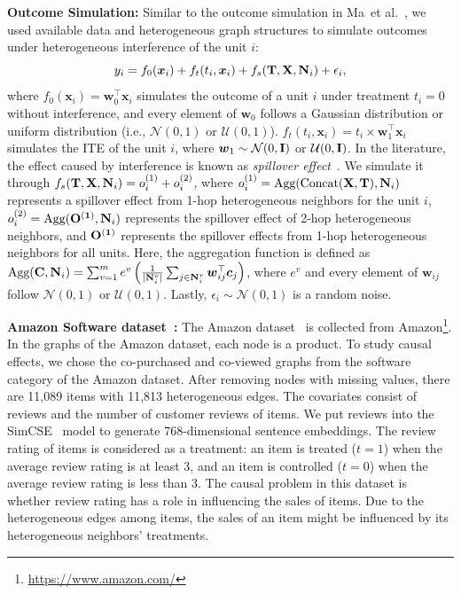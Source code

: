 \documentclass[runningheads]{llncs}
\newcommand{\etal}{{et al.}}
\begin{document}
\noindent\textbf{Outcome Simulation:}
Similar to the outcome simulation in Ma~\etal~\cite{ma2022learning}, we used available data and heterogeneous graph structures to simulate outcomes under heterogeneous interference of the unit $i$:
\begin{equation} \label{sim:outcome1}
y_i = f_{0}(\boldsymbol{x}_i) + f_{t}(t_i,\boldsymbol{x}_i) + f_s(\bold{T},\bold{X},\bold{N}_i) + \epsilon_i,
\end{equation}
where $f_{0}(\boldsymbol{x}_i)=\boldsymbol{w}_0^{\top}\boldsymbol{x}_i$ simulates the outcome of a unit $i$ under treatment $t_i=0$ without interference, and every element of $\boldsymbol{w}_0$ follows a Gaussian distribution or uniform distribution (i.e., $\mathcal{N}(0,1)$ or $\mathcal{U}(0,1)$). $f_{t}(t_i,\boldsymbol{x}_i)=t_i\times\boldsymbol{w}_1^{\top}\boldsymbol{x}_i$ simulates the ITE of the unit $i$, where $\boldsymbol{w}_1\sim \mathcal{N}(0,\bold{I})$ or $\mathcal{U}(0,\bold{I})$. In the literature, the effect caused by interference is known as \emph{spillover effect}~\cite{rakesh2018linked}. We simulate it through  $f_s(\bold{T},\bold{X},\bold{N}_i)= o^{(1)}_i + o^{(2)}_i$, where $o^{(1)}_i=\text{Agg}(\text{Concat}(\bold{X},\bold{T}),\bold{N}_i)$ represents a spillover effect from 1-hop heterogeneous neighbors for the unit $i$, $o_i^{(2)}=\text{Agg}(\bold{O^{(1)}},\bold{N}_i)$ represents the spillover effect of 2-hop heterogeneous neighbors, and $\bold{O^{(1)}}$ represents the spillover effects from 1-hop heterogeneous neighbors for all units. Here, the aggregation function is defined as $\text{Agg}(\bold{C},\bold{N}_i)= \sum_{v=1}^m e^v\left(\frac{1}{|\bold{N}_{i}^v|}\sum_{j \in \bold{N}_{i}^v}\boldsymbol{w}_{ij}^{\top}\boldsymbol{c}_j\right)$,
where $e^{v}$ and every element of $\boldsymbol{w}_{ij}$ follow $\mathcal{N}(0,1)$ or $\mathcal{U}(0,1)$. Lastly, $\epsilon_i\sim \mathcal{N}(0,1)$ is a random noise. 

\noindent\textbf{Amazon Software dataset~\cite{he2016ups}:} The Amazon dataset~\cite{he2016ups} is collected from Amazon\footnote{\url{https://www.amazon.com/}}. In the graphs of the Amazon dataset, each node is a product.
To study causal effects, we chose the co-purchased and co-viewed graphs from the software category of the Amazon dataset. 
After removing nodes with missing values, there are 11,089 items with 11,813 heterogeneous edges. The covariates consist of reviews and the number of customer reviews of items. We put reviews into the SimCSE~\cite{gao2021simcse} model to generate 768-dimensional sentence embeddings. The review rating of items is considered as a treatment: an item is treated ($t=1$) when the average review rating is at least 3, and an item is controlled ($t=0$) when the average review rating is less than 3. 
The causal problem in this dataset is whether review rating has a role in influencing the sales of items. Due to the heterogeneous edges among items, the sales of an item might be influenced by its heterogeneous neighbors' treatments.
\end{document}
